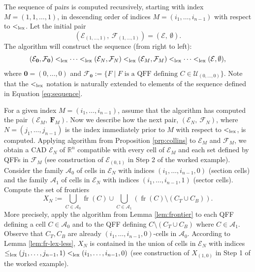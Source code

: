 \documentclass[
]{book}
\theoremstyle{definition}
\theoremstyle{definition}
\theoremstyle{definition}
\theoremstyle{definition}
\theoremstyle{remark}
\begin{document}
The sequence of pairs is computed recursively, starting with index \(M=(1,1, \ldots ,1)\),
in descending order of indices \(M=(i_1, \ldots, i_{n-1})\) with respect to \(<_{\rm{lex}}\).
Let the initial pair
\[({\mathcal E}_{(1, \ldots, 1)},\ \mathcal{F}_{(1, \ldots, 1)}) = ({\mathcal E},\ \emptyset).\]
The algorithm will construct the sequence (from right to left):
\begin{equation}
({\mathcal E}_{\mathbf{0}}, \mathcal{F}_{\mathbf{0}}) <_{\rm{lex}}\cdots <_{\rm{lex}}
({\mathcal E}_N, \mathcal{F}_N) <_{\rm{lex}}({\mathcal E}_M, \mathcal{F}_M)
<_{\rm{lex}}\cdots
<_{\rm{lex}}({\mathcal E} , \emptyset),
\label{eq:sequence}
\end{equation}
where \(\mathbf{0} = (0,\ldots,0)\) and \(\mathcal{F}_{\mathbf{0}} := \{ F \mid F \text{ is a QFF defining } C \in{\mathcal U}_{(0, \ldots ,0)} \}\). Note that the \(<_{\rm{lex}}\) notation is naturally extended to elements of the sequence defined in Equation \eqref{eq:sequence}.

For a given index \(M=(i_1,\ldots,i_{n-1})\), assume that the algorithm has computed the pair \((\mathcal{E}_M,\ \mathbf{F}_M)\).
Now we describe how the next pair, \(({\mathcal E}_N,\ \mathcal{F}_N)\), where \(N=(j_1, \ldots ,j_{n-1})\) is the index immediately prior to \(M\) with respect to \(<_{\rm{lex}}\), is computed.
Applying algorithm from Proposition \ref{prp:collins} to \({\mathcal E}_M\) and \(\mathcal{F}_M\), we obtain a CAD
\({\mathcal E}_{N}\) of \(\mathbb{R}^n\) compatible with every cell of \({\mathcal E}_M\) and each set defined by QFFs in \(\mathcal{F}_M\)
(see construction of \(\mathcal{E}_{(0,1)}\) in Step 2 of the worked example).
Consider the family \({\mathcal A}_0\) of cells in \({\mathcal E}_{N}\) with indices \((i_1,\ldots,i_{n-1},0)\)
(section cells)
and the family \({\mathcal A}_1\) of cells in \({\mathcal E}_{N}\) with indices \((i_1,\ldots,i_{n-1},1)\)
(sector cells).
Compute the set of frontiers
\begin{equation}
\label{eq:front}
X_{N} := \bigcup_{C \in {\mathcal A}_0}{\operatorname{fr} \left( C \right)} \cup \bigcup_{C \in {\mathcal A}_1}({\operatorname{fr} \left( C \right)} \setminus (C_T \cup C_B)).
\end{equation}
More precisely, apply the algorithm from Lemma \ref{lem:frontier} to each QFF defining a cell \(C \in \mathcal{A}_0\) and to the QFF defining \(C \setminus (C_T \cup C_B)\) where \(C \in \mathcal{A}_1\). Observe that \(C_T, C_B\) are already \((i_1,\ldots,i_{n-1},0)\)-cells in \(\mathcal{A}_0\).
According to Lemma \ref{lem:fr-lex-less}, \(X_{N}\) is contained in the union of cells in \({\mathcal E}_{N}\)
with indices \(\le_{\rm{lex}}(j_1,\ldots,j_{n-1},1) <_{\rm{lex}}(i_1,\ldots,i_{n-1},0)\) (see construction of \(X_{(1,0)}\) in Step 1 of the worked example).
\end{document}
